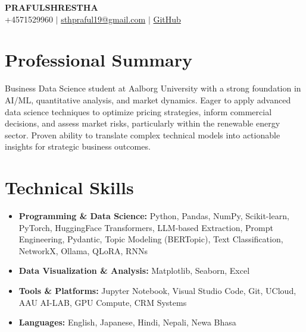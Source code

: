 \documentclass[10pt, letterpaper]{article}
\begin{document}
\begin{center}
    {\Huge \textbf{PRAFULSHRESTHA}} \\ \vspace{4pt}
    +4571529960 $|$ \href{mailto:sthpraful19@gmail.com}{sthpraful19@gmail.com} $|$ \href{https://https://github.com/xprafulx}{GitHub}
\end{center}

\section{Professional Summary}
Business Data Science student at Aalborg University with a strong foundation in AI/ML, quantitative analysis, and market dynamics. Eager to apply advanced data science techniques to optimize pricing strategies, inform commercial decisions, and assess market risks, particularly within the renewable energy sector. Proven ability to translate complex technical models into actionable insights for strategic business outcomes.

\section{Technical Skills}
\begin{itemize}[leftmargin=0.15in, label={}, itemsep=-2pt]
    \item \textbf{Programming \& Data Science:} Python, Pandas, NumPy, Scikit-learn, PyTorch, HuggingFace Transformers, LLM-based Extraction, Prompt Engineering, Pydantic, Topic Modeling (BERTopic), Text Classification, NetworkX, Ollama, QLoRA, RNNs
    \item \textbf{Data Visualization \& Analysis:} Matplotlib, Seaborn, Excel
    \item \textbf{Tools \& Platforms:} Jupyter Notebook, Visual Studio Code, Git, UCloud, AAU AI-LAB, GPU Compute, CRM Systems
    \item \textbf{Languages:} English, Japanese, Hindi, Nepali, Newa Bhasa

\end{itemize}

\end{document}
